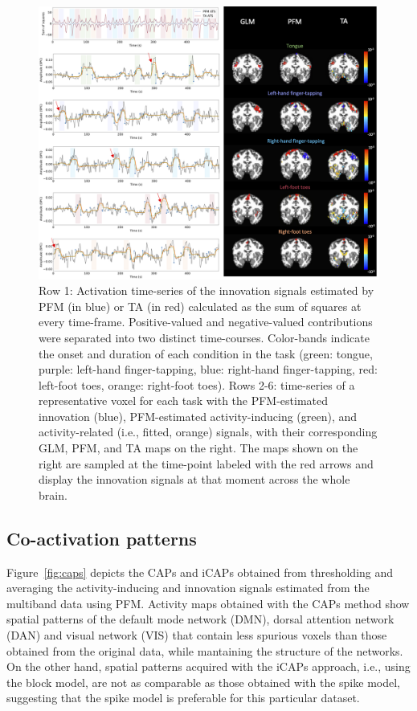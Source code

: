\begin{figure}[H]
    \begin{center}
        \includegraphics[width=\textwidth]{figures/task_maps.png}
    \end{center}
    \caption{Row 1: Activation time-series of the innovation signals estimated by PFM (in blue) or TA (in red) calculated as the sum of squares at every time-frame. Positive-valued and negative-valued contributions were separated into two distinct time-courses. Color-bands indicate the onset and duration of each condition in the task (green: tongue, purple: left-hand finger-tapping, blue: right-hand finger-tapping, red: left-foot toes, orange: right-foot toes). Rows 2-6: time-series of a representative voxel for each task with the PFM-estimated innovation (blue), PFM-estimated activity-inducing (green), and activity-related (i.e., fitted, orange) signals, with their corresponding GLM, PFM, and TA maps on the right. The maps shown on the right are sampled at the time-point labeled with the red arrows and display the innovation signals at that moment across the whole brain.}
\label{fig:task_maps}
\end{figure}

\subsection{Co-activation patterns}

Figure~\ref{fig:caps} depicts the CAPs and iCAPs obtained from thresholding and averaging the activity-inducing and innovation signals estimated from the multiband data using PFM. Activity maps obtained with the CAPs method show spatial patterns of the default mode network (DMN), dorsal attention network (DAN) and visual network (VIS) that contain less spurious voxels than those obtained from the original data, while mantaining the structure of the networks. On the other hand, spatial patterns acquired with the iCAPs approach, i.e., using the block model, are not as comparable as those obtained with the spike model, suggesting that the spike model is preferable for this particular dataset.

